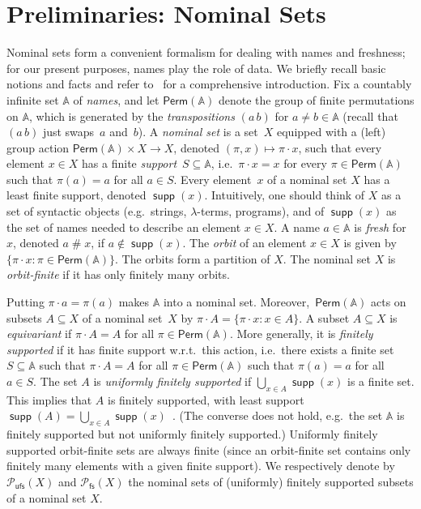 \documentclass[final,a4paper,UKenglish,thm-restate,autoref,numberwithinsect]{lipics-v2021}
\newcommand{\compr}{:}
\renewcommand{\o}{\cdot}
\numberwithin{equation}{section}
\newcommand{\seq}{\subseteq}
\newcommand{\Perm}{\mathsf{Perm}}
\newcommand{\pow}{\mathcal{P}}
\newcommand{\fs}{\mathsf{fs}}
\newcommand{\+}[1]{\mathcal{#1}\xspace}
\newcommand{\Pow}{\mathcal{P}}
\newcommand{\ufs}{{\mathsf{ufs}}}
\newcommand{\names}{\mathbb{A}}
\DeclareMathOperator{\supp}{\mathsf{supp}} %
\newcommand{\fresh}{\mathbin{\#}}
\newcommand{\powfs}{\pow_{\fs}}
\theoremstyle{definition}
\begin{document}
\section{Preliminaries: Nominal Sets}
\label{sec:prelim}
Nominal sets form a convenient formalism for dealing with names and
freshness; for our present purposes, names play the role of data. We
briefly recall basic notions and facts and refer to~\cite{Pitts13} for a
comprehensive introduction. Fix a countably infinite set $\names$ of \emph{names}, and let $\Perm(\names)$
denote the group of finite permutations on $\names$, which is
generated by the \emph{transpositions} $(a\, b)$ for $a\neq b\in\names$
(recall that $(a\, b)$ just swaps~$a$ and~$b$). A \emph{nominal set} is a
set~$X$ equipped with a (left) group action $\Perm(\names)\times X\to X$, denoted $(\pi,x)\mapsto \pi\o x$, such that
every element $x\in X$ has a finite \emph{support}~$S\subseteq\names$,
i.e.~$\pi\cdot x=x$ for every $\pi\in \Perm(\names)$ such that $\pi(a)=a$ for all
$a\in S$. Every element~$x$ of a nominal set $X$ has a least finite
support, denoted $\supp(x)$. Intuitively, one should think of $X$ as a set of syntactic objects (e.g.~strings, $\lambda$-terms, programs), and of $\supp(x)$ as the set of names
 needed to describe an element $x\in X$. A name $a\in\names$ is \emph{fresh}
for~$x$, denoted $a\fresh x$, if $a\notin\supp(x)$. The \emph{orbit} of an element $x\in X$ is given by $\{ \pi\o x: \pi\in\Perm(\names)\}$. The orbits form a partition of $X$. The nominal set $X$ is \emph{orbit-finite} if it has only finitely many orbits.

Putting $\pi\cdot a = \pi(a)$ makes
$\names$ into a nominal set. Moreover,~$\Perm(\names)$ acts on subsets
$A\subseteq X$ of a nominal set~$X$ by
$\pi\cdot A = \{\pi\cdot x \compr x \in A\}$. A subset $A\seq X$ is \emph{equivariant} if $\pi\o A=A$ for all $\pi\in \Perm(\names)$. More generally, it is \emph{finitely
  supported} if it has finite support w.r.t.\ this action, i.e.~there exists a finite set $S\seq \names$ such that $\pi\o A = A$ for all $\pi\in \Perm(\names)$ such that $\pi(a)=a$ for all $a\in S$. The set $A$ is \emph{uniformly finitely supported} if $\bigcup_{x\in A} \supp(x)$ is a finite set. This implies that $A$ is finitely supported, with least support $\supp(A)=\bigcup_{x\in A} \supp(x)$~\cite[Theorem~2.29]{gabbay2011}. (The converse does not
hold, e.g.~the set $\names$ is finitely supported but not uniformly
finitely supported.) Uniformly finitely supported
orbit-finite sets are always finite (since an orbit-finite set contains only finitely many elements with a given finite support).  We respectively denote by $\Pow_\ufs(X)$ and $\powfs(X)$ the nominal sets of (uniformly) finitely supported subsets of a nominal set $X$. 
\end{document}
